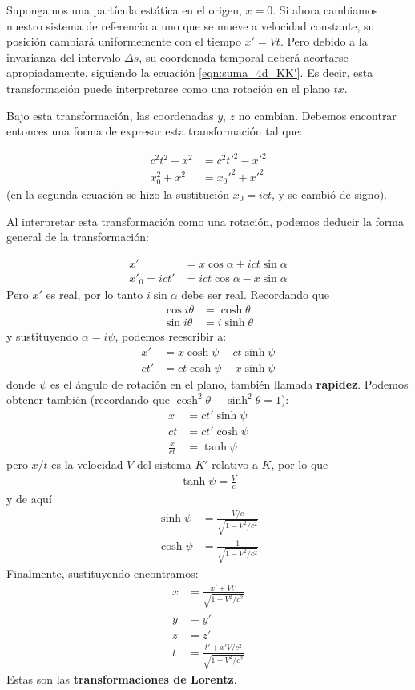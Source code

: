 \documentclass[]{article}
\numberwithin{equation}{section}
\begin{document}
Supongamos una partícula estática en el origen, $x=0$. Si ahora cambiamos nuestro sistema de referencia a uno que se mueve a velocidad constante, su posición cambiará uniformemente con el tiempo $x'=Vt$. Pero debido a la invarianza del intervalo $\Delta s$, su coordenada temporal deberá acortarse apropiadamente, siguiendo la ecuación \ref{eqn:suma_4d_KK'}. Es decir, esta transformación puede interpretarse como una rotación en el plano $tx$.

Bajo esta transformación, las coordenadas $y$, $z$ no cambian. Debemos encontrar entonces una forma de expresar esta transformación tal que:

\begin{align*}
	c^2 t^2 - x^2 &= c^2 t'^2 - x'^2\\
	x_0^2 + x^2 &= x_0'^2 + x'^2 
\end{align*}
(en la segunda ecuación se hizo la sustitución $x_0=ict$, y se cambió de signo).

Al interpretar esta transformación como una rotación, podemos deducir la forma general de la transformación:

\begin{align}
	x' &= x\cos{\alpha} + ict \sin{\alpha}\\
	x'_0 = ict' &= ict \cos{\alpha} - x\sin{\alpha}
\end{align}
Pero $x'$ es real, por lo tanto $i\sin{\alpha}$ debe ser real. Recordando que
\begin{align}
	\cos{i\theta} &= \cosh{\theta}\\
	\sin{i\theta} &= i\sinh{\theta}
\end{align}
y sustituyendo $\alpha = i \psi$, podemos reescribir a:
\begin{align}
	x' &= x\cosh{\psi} - ct \sinh{\psi}\\
	ct' &= ct \cosh{\psi} - x\sinh{\psi}
\end{align}
donde $\psi$ es el ángulo de rotación en el plano, también llamada \textbf{rapidez}. Podemos obtener también (recordando que $\cosh^2{\theta} - \sinh^2{\theta} = 1$):
\begin{align}
	x &= ct'\sinh{\psi}\\
	ct &= ct'\cosh{\psi}\\
	\frac{x}{ct} &= \tanh{\psi}
\end{align}
pero $x/t$ es la velocidad $V$ del sistema $K'$ relativo a $K$, por lo que
\begin{align}
	\tanh{\psi} = \frac{V}{c}
\end{align}
y de aquí
\begin{align}
	\sinh{\psi} &= \frac{V/c}{\sqrt{1-V^2/c^2}} \\
	\cosh{\psi} &= \frac{1}{\sqrt{1-V^2/c^2}}
\end{align}
Finalmente, sustituyendo encontramos:
\begin{align}
	x &= \frac{x' + Vt'}{\sqrt{1-V^2/c^2}} \\
	y &= y' \\
	z &= z' \\
	t &= \frac{t' + x'V/c^2}{\sqrt{1-V^2/c^2}}
\end{align}
Estas son las \textbf{transformaciones de Lorentz}.
\end{document}
